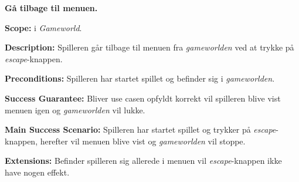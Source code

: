 \textbf{Gå tilbage til menuen.}\newline

\textbf{Scope:}\newline
i \textit{Gameworld}.\newline

\textbf{Description:} \newline
Spilleren går tilbage til menuen fra \textit{gameworlden} ved at trykke på \textit{escape}-knappen.\newline

\textbf{Preconditions:}\newline
Spilleren har startet spillet og befinder sig i \textit{gameworlden}.\newline

\textbf{Success Guarantee:}\newline
Bliver use casen opfyldt korrekt vil spilleren blive vist menuen igen og \textit{gameworlden} vil lukke.\newline

\textbf{Main Success Scenario:}\newline
Spilleren har startet spillet og trykker på \textit{escape}-knappen, herefter vil menuen blive vist og \textit{gameworlden} vil stoppe. \newline

\textbf{Extensions:}\newline
Befinder spilleren sig allerede i menuen vil \textit{escape}-knappen ikke have nogen effekt.\newline